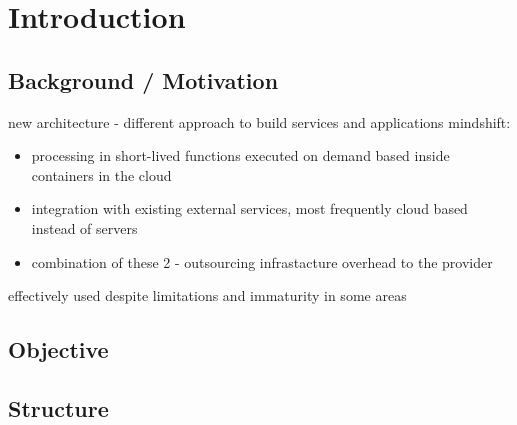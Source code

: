 \chapter{Introduction}

\section*{Background / Motivation}

new architecture - different approach to build services and applications
mindshift:

\begin{itemize}
  \item processing in short-lived functions executed on demand based inside containers in the cloud
  \item integration with existing external services, most frequently cloud based instead of servers
  \item combination of these 2 - outsourcing infrastacture overhead to the provider
\end{itemize}
  
effectively used despite limitations and immaturity in some areas

\section*{Objective}

\section*{Structure}